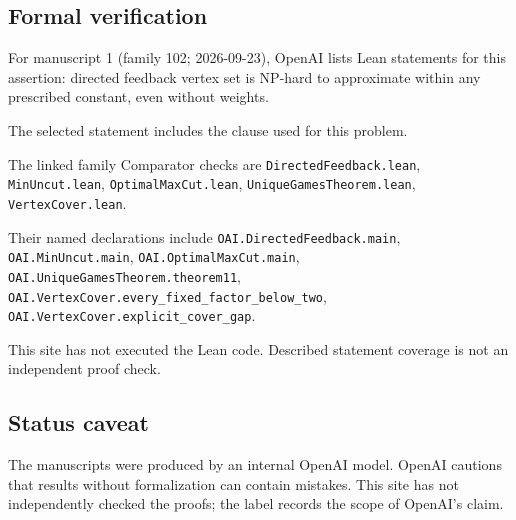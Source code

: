 \documentclass[11pt]{article}
\begin{document}
\subsection{Formal verification}
For manuscript 1 (family 102; 2026-09-23), OpenAI lists Lean statements for this assertion: directed feedback vertex set is NP-hard to approximate within any prescribed constant, even without weights.

The selected statement includes the clause used for this problem.

The linked family Comparator checks are \texttt{DirectedFeedback.lean}, \texttt{MinUncut.lean}, \texttt{OptimalMaxCut.lean}, \texttt{UniqueGamesTheorem.lean}, \texttt{VertexCover.lean}.

Their named declarations include \texttt{OAI.DirectedFeedback.main}, \texttt{OAI.MinUncut.main}, \texttt{OAI.OptimalMaxCut.main}, \texttt{OAI.UniqueGamesTheorem.theorem11}, \texttt{OAI.VertexCover.every\_fixed\_factor\_below\_two}, \texttt{OAI.VertexCover.explicit\_cover\_gap}.

This site has not executed the Lean code. Described statement coverage is not an independent proof check.

\subsection{Status caveat}
The manuscripts were produced by an internal OpenAI model. OpenAI cautions that results without formalization can contain mistakes. This site has not independently checked the proofs; the label records the scope of OpenAI's claim.
\end{document}
